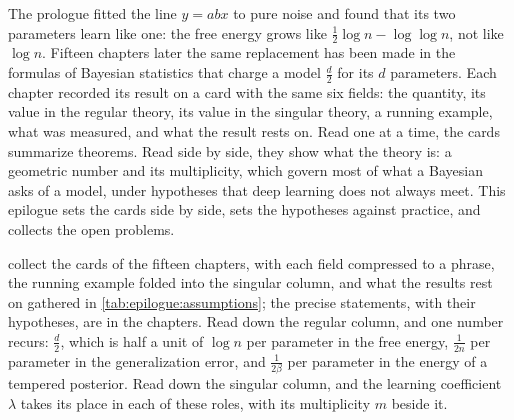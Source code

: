 \begin{refsection}

The prologue fitted the line $y=abx$ to pure noise and found that its two parameters learn like one: the free energy grows like $\tfrac12\log n-\log\log n$, not like $\log n$. Fifteen chapters later the same replacement has been made in the formulas of Bayesian statistics that charge a model $\tfrac d2$ for its $d$ parameters. Each chapter recorded its result on a card with the same six fields: the quantity, its value in the regular theory, its value in the singular theory, a running example, what was measured, and what the result rests on. Read one at a time, the cards summarize theorems. Read side by side, they show what the theory is: a geometric number and its multiplicity, which govern most of what a Bayesian asks of a model, under hypotheses that deep learning does not always meet. This epilogue sets the cards side by side, sets the hypotheses against practice, and collects the open problems.


 collect the cards of the fifteen chapters, with each field compressed to a phrase, the running example folded into the singular column, and what the results rest on gathered in \cref{tab:epilogue:assumptions}; the precise statements, with their hypotheses, are in the chapters. Read down the regular column, and one number recurs: $\tfrac d2$, which is half a unit of $\log n$ per parameter in the free energy, $\tfrac1{2n}$ per parameter in the generalization error, and $\tfrac1{2\beta}$ per parameter in the energy of a tempered posterior. Read down the singular column, and the learning coefficient $\lambda$ takes its place in each of these roles, with its multiplicity $m$ beside it.


\end{refsection}
